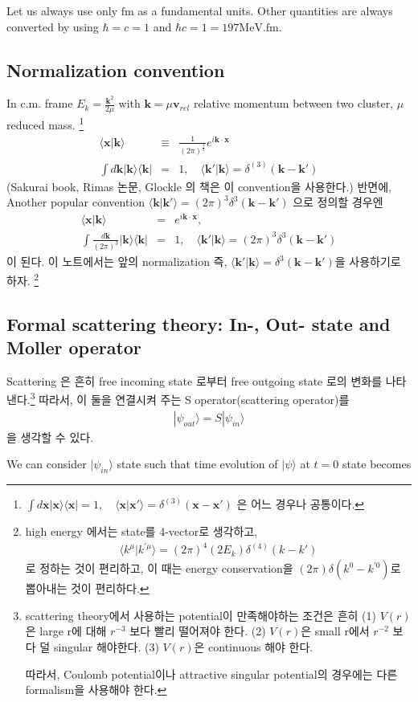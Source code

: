 \documentclass[10pt]{article}
\def\bm{\boldsymbol}
\newcommand{\bea}{\begin{eqnarray}}
\newcommand{\eea}{\end{eqnarray}}
\newcommand{\no}{\nonumber \\}
\def\vk{{\bm k}}
\def\vx{{\bm x}}
\def\la{\langle}
\def\ra{\rangle}
\begin{document}
\begin{itemize}
Let us always use only $\mbox{fm}$ as a fundamental units. Other quantities are always converted by using
$\hbar=c=1$ and $\hbar c=1=197 \mbox{MeV}.\mbox{fm}$.



\end{itemize}

\subsection{Normalization convention}

In c.m. frame $E_k=\frac{\vk^2}{2\mu}$
with $\vk=\mu {\bm v}_{rel}$ relative momentum
between two cluster, $\mu$ reduced mass.
\footnote{
$\int d\vx |\vx\ra \la \vx|=1, \quad \la \vx|\vx'\ra
=\delta^{(3)}(\vx-\vx')$ 은 어느 경우나 공통이다.
}
\bea
\la \vx|\vk\ra&\equiv&\frac{1}{(2\pi)^\frac{3}{2}}e^{i\vk\cdot\vx}
\no
\int d\vk |\vk\ra \la \vk|&=&1, \quad \la \vk'|\vk\ra=\delta^{(3)}(\vk-\vk')
\eea
(Sakurai book, Rimas 논문, Glockle 의 책은 이 convention을 사용한다.)
반면에, Another popular convention 
$\la \vk|\vk'\ra=(2\pi)^3\delta^3(\vk-\vk')$ 으로 정의할 경우엔 
\bea
\la \vx|\vk\ra&=&e^{i\vk\cdot\vx},\no 
\int \frac{d\vk}{(2\pi)^3} |\vk\ra \la \vk|&=&1, 
\quad \la \vk'|\vk\ra=(2\pi)^3 \delta^{3}(\vk-\vk')
\eea
이 된다. 이 노트에서는 앞의 normalization 즉, $\la \vk'|\vk\ra=\delta^3(\vk-\vk')$을
사용하기로 하자.
\footnote{ high energy 에서는 state를 4-vector로
생각하고,
\bea
\la k^\mu | k^{'\mu}\ra=(2\pi)^4(2E_k)\delta^{(4)}(k-k')
\eea
로 정하는 것이 편리하고, 이 때는 energy conservation을
$(2\pi)\delta(k^0-k^{'0})$로 뽑아내는 것이 편리하다. }


\subsection{Formal scattering theory: In-, Out- state and Moller operator}
Scattering 은 흔히 free incoming state 로부터 
free outgoing state 로의 변화를 나타낸다.\footnote{
scattering theory에서 사용하는 potential이 만족해야하는 조건은 
흔히  (1) $V(r)$ 은 large r에 대해 $r^{-3}$ 보다 빨리 떨어져야 한다. 
(2) $V(r)$은 small r에서 $r^{-2}$ 보다 덜 singular 해야한다.
(3) $V(r)$은 continuous 해야 한다. 

따라서, Coulomb potential이나 attractive singular potential의 경우에는 
다른 formalism을 사용해야 한다. 
}
따라서, 이 둘을 연결시켜 주는 S operator(scattering operator)를 
\bea
|\psi_{out}\ra=S|\psi_{in}\ra
\eea
을 생각할 수 있다. 

We can consider $|\psi_{in}\ra$ state such that 
time evolution of $|\psi\ra$ at $t=0$ state becomes
\end{document}
